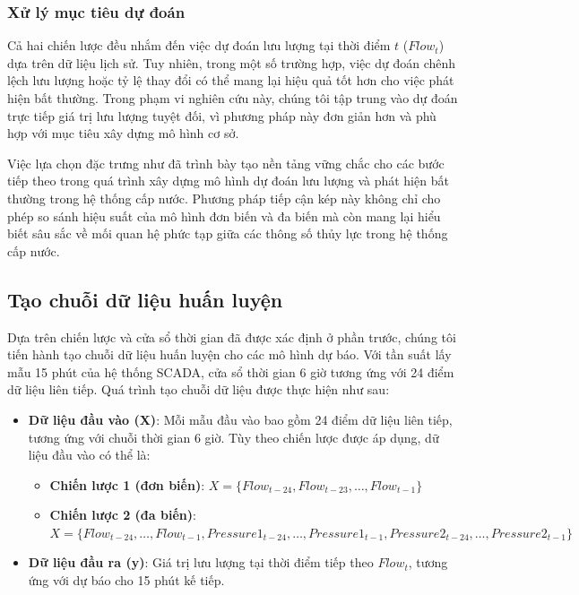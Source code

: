 \subsubsection{Xử lý mục tiêu dự đoán}

Cả hai chiến lược đều nhắm đến việc dự đoán lưu lượng tại thời điểm $t$ ($Flow_t$) dựa trên dữ liệu lịch sử. Tuy nhiên, trong một số trường hợp, việc dự đoán chênh lệch lưu lượng hoặc tỷ lệ thay đổi có thể mang lại hiệu quả tốt hơn cho việc phát hiện bất thường. Trong phạm vi nghiên cứu này, chúng tôi tập trung vào dự đoán trực tiếp giá trị lưu lượng tuyệt đối, vì phương pháp này đơn giản hơn và phù hợp với mục tiêu xây dựng mô hình cơ sở.

Việc lựa chọn đặc trưng như đã trình bày tạo nền tảng vững chắc cho các bước tiếp theo trong quá trình xây dựng mô hình dự đoán lưu lượng và phát hiện bất thường trong hệ thống cấp nước. Phương pháp tiếp cận kép này không chỉ cho phép so sánh hiệu suất của mô hình đơn biến và đa biến mà còn mang lại hiểu biết sâu sắc về mối quan hệ phức tạp giữa các thông số thủy lực trong hệ thống cấp nước.

\subsection{Tạo chuỗi dữ liệu huấn luyện}

Dựa trên chiến lược và cửa sổ thời gian đã được xác định ở phần trước, chúng tôi tiến hành tạo chuỗi dữ liệu huấn luyện cho các mô hình dự báo. Với tần suất lấy mẫu 15 phút của hệ thống SCADA, cửa sổ thời gian 6 giờ tương ứng với 24 điểm dữ liệu liên tiếp. Quá trình tạo chuỗi dữ liệu được thực hiện như sau:

\begin{itemize}
    \item \textbf{Dữ liệu đầu vào (X)}: Mỗi mẫu đầu vào bao gồm 24 điểm dữ liệu liên tiếp, tương ứng với chuỗi thời gian 6 giờ. Tùy theo chiến lược được áp dụng, dữ liệu đầu vào có thể là:
    \begin{itemize}
        \item \textbf{Chiến lược 1 (đơn biến)}: $X = \{Flow_{t-24}, Flow_{t-23}, \ldots, Flow_{t-1}\}$
        \item \textbf{Chiến lược 2 (đa biến)}: $X = \{Flow_{t-24}, \ldots, Flow_{t-1}, Pressure1_{t-24}, \ldots, Pressure1_{t-1}, Pressure2_{t-24}, \ldots, Pressure2_{t-1}\}$
    \end{itemize}
    
    \item \textbf{Dữ liệu đầu ra (y)}: Giá trị lưu lượng tại thời điểm tiếp theo $Flow_t$, tương ứng với dự báo cho 15 phút kế tiếp.
\end{itemize}

